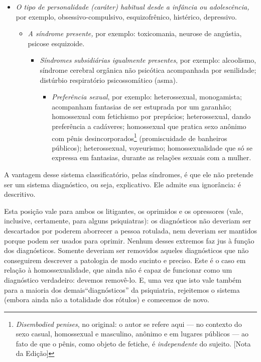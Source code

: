 \begin{itemize}
  \item[A.] \textit{O tipo de personalidade (caráter) habitual desde a infância
  ou adolescência,} por exemplo, obsessivo-compulsivo, esquizofrênico,
  histérico, depressivo.

  \begin{itemize}
    \item[1.] \textit{A síndrome\idxsindr{} presente,}\idxdiagsind{} por exemplo: toxicomania, neurose
    de angústia, psicose esquizoide.

    \begin{itemize}
      \item[a.] \textit{Síndromes} \textit{subsidiárias igualmente presentes},
      por exemplo: alcoolismo, síndrome cerebral orgânica não psicótica
      acompanhada por senilidade; distúrbio respiratório psicossomático
      (asma).

      \begin{itemize}
        \item[(1)] \textit{Preferência sexual}, por exemplo: heterossexual,
        monogamista; acompanham fantasias de ser estuprada por um garanhão;
        homossexual com fetichismo por prepúcios; heterossexual, dando
        preferência a cadáveres; homossexual que pratica sexo anônimo com
        pênis desincorporados\footnote{ \textit{Disembodied penises}, no original:
        	o autor se refere aqui --- no contexto do sexo casual, homossexual e masculino,
        anônimo e em lugares públicos --- ao fato de que o pênis, como objeto de fetiche, é \textit{independente} do sujeito. [Nota da Edição]}
        (promiscuidade de banheiros públicos); heterossexual,
        voyeurismo; homossexualidade que só se expressa em fantasias, durante
        as relações sexuais com a mulher.
      \end{itemize}
    \end{itemize}
  \end{itemize}
\end{itemize}

A vantagem desse sistema classificatório,\idxclass{} pelas síndromes,\idxdiagsind{} é que ele
não pretende ser um sistema diagnóstico, ou seja, explicativo. Ele
admite sua ignorância: é descritivo.

Esta posição vale para ambos os litigantes, os oprimidos e os
opressores (vale, inclusive, certamente, para alguns psiquiatras): os
diagnósticos não deveriam ser descartados por poderem aborrecer a
pessoa rotulada, nem deveriam ser mantidos porque podem ser usados para
oprimir. Nenhum desses extremos faz jus à função dos diagnósticos.
Somente deveriam ser removidos aqueles diagnósticos que não conseguirem
descrever a patologia de modo sucinto e preciso. Este é o caso em
relação à homossexualidade, que ainda não é capaz de funcionar como um
diagnóstico verdadeiro: devemos removê-lo. E, uma vez que isto vale
também para a maioria dos demais\idxhomos[|)]
``diagnósticos'' da psiquiatria, rejeitemos o
sistema (embora ainda não a totalidade dos rótulos) e comecemos de
novo.




